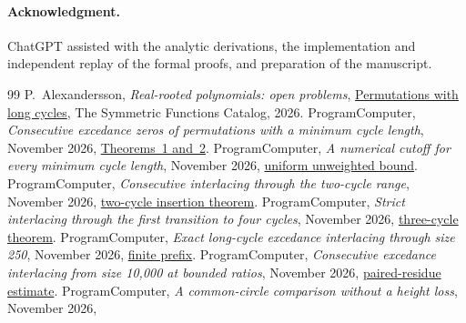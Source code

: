 \documentclass[11pt]{article}
\begin{document}
\paragraph{Acknowledgment.}
ChatGPT assisted with the analytic derivations, the implementation and independent replay of the formal proofs, and preparation of the manuscript.
\begingroup
\small
\begin{thebibliography}{99}
\setlength{\itemsep}{0pt}
P.~Alexandersson, \emph{Real-rooted polynomials: open problems},
\href{https://www.symmetricfunctions.com/realRootedOpenProblems.htm\#permutations-with-long-cycles}{Permutations with long cycles},
The Symmetric Functions Catalog, 2026.
ProgramComputer, \emph{Consecutive excedance zeros of permutations with a minimum cycle length}, November 2026,
\href{https://github.com/ProgramComputer/open-math-research/blob/4da48b72ed8f92f96c2faf60e2d63d253b3b507a/topics/long-cycle-excedances/paper.tex}{Theorems~1 and~2}.
ProgramComputer, \emph{A numerical cutoff for every minimum cycle length},
November 2026,
\href{https://github.com/ProgramComputer/open-math-research/blob/4da48b72ed8f92f96c2faf60e2d63d253b3b507a/topics/long-cycle-excedances/effective-interlacing.tex}{uniform unweighted bound}.
ProgramComputer, \emph{Consecutive interlacing through the two-cycle range}, November 2026,
\href{https://github.com/ProgramComputer/open-math-research/blob/4da48b72ed8f92f96c2faf60e2d63d253b3b507a/topics/long-cycle-excedances/two-cycle-insertion.tex}{two-cycle insertion theorem}.
ProgramComputer, \emph{Strict interlacing through the first transition to four cycles}, November 2026,
\href{https://github.com/ProgramComputer/open-math-research/blob/e554fb387edbf68f5e2094773016f81b9d618498/topics/long-cycle-excedances/three-cycle-complete.md}{three-cycle theorem}.
ProgramComputer, \emph{Exact long-cycle excedance interlacing through size 250}, November 2026,
\href{https://github.com/ProgramComputer/open-math-research/blob/e554fb387edbf68f5e2094773016f81b9d618498/topics/long-cycle-excedances/finite-prefix/README.md}{finite prefix}.
ProgramComputer, \emph{Consecutive excedance interlacing from size 10,000 at bounded ratios}, November 2026,
\href{https://github.com/ProgramComputer/open-math-research/blob/e554fb387edbf68f5e2094773016f81b9d618498/topics/long-cycle-excedances/paired-residues/README.md}{paired-residue estimate}.
ProgramComputer, \emph{A common-circle comparison without a height loss}, November 2026,

\end{thebibliography}
\end{document}
